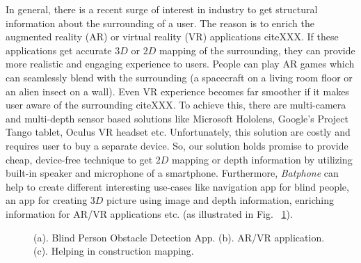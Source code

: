 In general, there is a recent surge of interest in industry to get structural information about the surrounding of a user. The reason is to enrich the augmented reality (AR) or virtual reality (VR) applications cite{XXX}. If these applications get accurate $3D$ or $2D$ mapping of the surrounding, they can provide more realistic and engaging experience to users. People can play AR games which can seamlessly blend with the surrounding (\eg a spacecraft on a living room floor or an alien insect on a wall). Even VR experience becomes far smoother if it makes user aware of the surrounding cite{XXX}. To achieve this, there are multi-camera and multi-depth sensor based solutions like Microsoft Hololens, Google's Project Tango tablet, Oculus VR headset etc. Unfortunately, this solution are costly and requires user to buy a separate device. So, our solution holds promise to provide cheap, device-free technique to get $2D$ mapping or depth information by utilizing built-in speaker and microphone of a smartphone. Furthermore, \textit{Batphone} can help to create different interesting use-cases like navigation app for blind people, an app for creating $3D$ picture using image and depth information, enriching information for AR/VR applications etc. (as illustrated in Fig. ~\ref{fig:apps}).\\

\begin{figure}[hbt]


\caption{{\small (a). Blind Person Obstacle Detection App. (b). AR/VR application. (c). Helping in construction mapping. }}
\label{fig:apps}

\end{figure}
 
